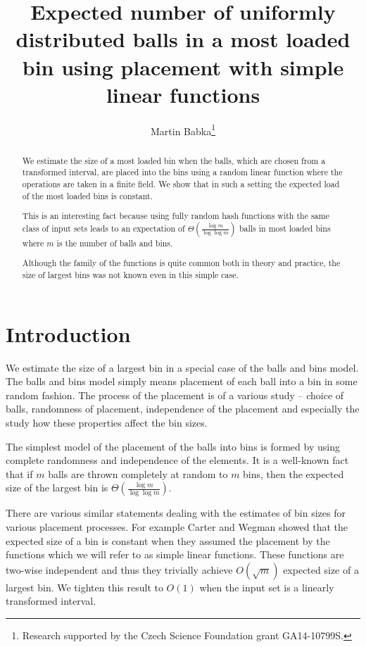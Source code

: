 \documentclass{article}
\title{Expected number of uniformly distributed balls in a most loaded bin using placement with simple linear functions}
\author{Martin Babka\thanks{Research supported by the Czech Science Foundation grant GA14-10799S.}}
\begin{document}
\maketitle

\begin{abstract}
We estimate the size of a most loaded bin when the balls, which are chosen from a transformed interval, are placed into the bins using a random linear function where the operations are taken in a finite field.
We show that in such a setting the expected load of the most loaded bins is constant.

This is an interesting fact because using fully random hash functions with the same class of input sets leads to an expectation of $\Theta\left(\frac{\log m}{\log \log m}\right)$ balls in most loaded bins where $m$ is the number of balls and bins.

Although the family of the functions is quite common both in theory and practice, the size of largest bins was not known even in this simple case.
\end{abstract}

\section{Introduction}

We estimate the size of a largest bin in a special case of the balls and bins model. The balls and bins model simply means placement of each ball into a bin in some random fashion. The process of the placement is of a various study -- choice of balls, randomness of placement, independence of the placement and especially the study how these properties affect the bin sizes.

The simplest model of the placement of the balls into bins is formed by using complete randomness and independence of the elements.
It is a well-known fact that if $m$ balls are thrown completely at random to $m$ bins, then the expected size of the largest bin is $\Theta\left(\frac{\log m}{\log \log m}\right)$.

There are various similar statements dealing with the estimates of bin sizes for various placement processes.
For example Carter and Wegman \cite{cw} showed that the expected size of a bin is constant when they assumed the placement by the functions which we will refer to as simple linear functions. These functions are two-wise independent and thus they trivially achieve $O(\sqrt{m})$ expected size of a largest bin. We tighten this result to $O(1)$ when the input set is a linearly transformed interval.
\end{document}
